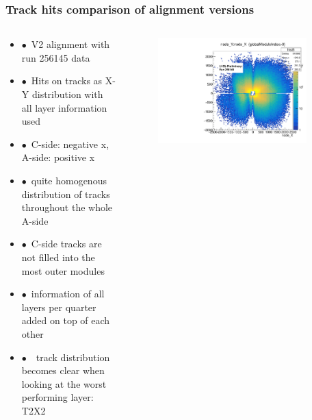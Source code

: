 \documentclass[aspectratio=1610, 12pt]{beamer}
\begin{document}
\begin{frame}\frametitle{Track hits comparison of alignment versions}
  \begin{columns}
    \begin{column}[c]{0.48\textwidth}
      \begin{itemize}
        \item $\bullet$\, V2 alignment with run 256145 data
        \item $\bullet$\, Hits on tracks as X-Y distribution with all layer information used
        \item $\bullet$\, C-side: negative x, A-side: positive x
        \item $\bullet$\, quite homogenous distribution of tracks throughout the whole A-side
        \item $\bullet$\, C-side tracks are not filled into the most outer modules
        \item $\bullet$\, information of all layers per quarter added on top of each other
        \item $\bullet$\, \to\, track distribution becomes clear when looking at the worst performing layer: T2X2
      \end{itemize}
    \end{column}
    \begin{column}[c]{0.48\textwidth}
      \begin{figure}
        \centering
        \includegraphics[width=0.9\textwidth]{tuples_out/combining_2D_nodeXY_v2.pdf}%
      \end{figure}
    \end{column}
  \end{columns}
\end{frame}
\end{document}
